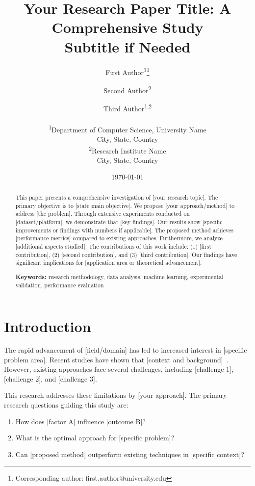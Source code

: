 \documentclass[12pt,a4paper]{article}
\title{\textbf{Your Research Paper Title: A Comprehensive Study}\\
\large Subtitle if Needed}
\author{
    First Author\textsuperscript{1}\thanks{Corresponding author: first.author@university.edu} \and
    Second Author\textsuperscript{2} \and
    Third Author\textsuperscript{1,2}\\
    \\
    \small \textsuperscript{1}Department of Computer Science, University Name\\
    \small City, State, Country\\
    \small \textsuperscript{2}Research Institute Name\\
    \small City, State, Country
}
\date{\today}
\theoremstyle{definition}
\theoremstyle{remark}
\begin{document}
\maketitle
\thispagestyle{fancy}

\begin{abstract}
\noindent
This paper presents a comprehensive investigation of [your research topic]. The primary objective is to [state main objective]. We propose [your approach/method] to address [the problem]. Through extensive experiments conducted on [dataset/platform], we demonstrate that [key findings]. Our results show [specific improvements or findings with numbers if applicable]. The proposed method achieves [performance metrics] compared to existing approaches. Furthermore, we analyze [additional aspects studied]. The contributions of this work include: (1) [first contribution], (2) [second contribution], and (3) [third contribution]. Our findings have significant implications for [application area or theoretical advancement].

\vspace{0.3cm}
\noindent\textbf{Keywords:} research methodology, data analysis, machine learning, experimental validation, performance evaluation
\end{abstract}

\newpage
\tableofcontents
\listoffigures
\newpage

\twocolumn

\section{Introduction}
\label{sec:introduction}

The rapid advancement of [field/domain] has led to increased interest in [specific problem area]. Recent studies have shown that [context and background]~\cite{reference1}. However, existing approaches face several challenges, including [challenge 1], [challenge 2], and [challenge 3].

This research addresses these limitations by [your approach]. The primary research questions guiding this study are:

\begin{enumerate}
    \item How does [factor A] influence [outcome B]?
    \item What is the optimal approach for [specific problem]?
    \item Can [proposed method] outperform existing techniques in [specific context]?
\end{enumerate}
\end{document}

